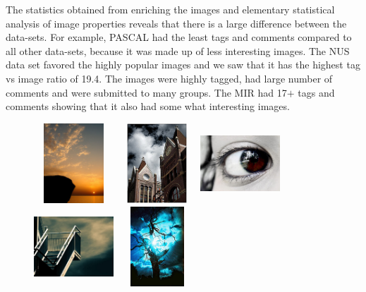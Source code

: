 The statistics obtained from enriching the images and elementary 
statistical analysis of image properties reveals that there is a 
large difference between the data-sets. For example, PASCAL had the least 
tags and comments compared to all other data-sets, because it was made 
up of less interesting images. The NUS data set favored the highly 
popular images and we saw that it has the highest tag vs image 
ratio of 19.4. The images were highly tagged, had large number of 
comments and were submitted to many groups. The MIR had 17$+$ tags 
and comments showing that it also had some what interesting images. 

\begin{center}
\begin{figure}
\centering
\includegraphics[width=3cm, height=3cm]{./Pictures/CLEF/1.jpg}
\includegraphics[width=3cm, height=3cm]{./Pictures/CLEF/2.jpg}
\includegraphics[width=3cm, height=3cm]{./Pictures/CLEF/3.jpg} \\
\includegraphics[width=3cm, height=3cm]{./Pictures/CLEF/4.jpg}
\includegraphics[width=3cm, height=3cm]{./Pictures/CLEF/5.jpg}

\end{figure}
\end{center}
